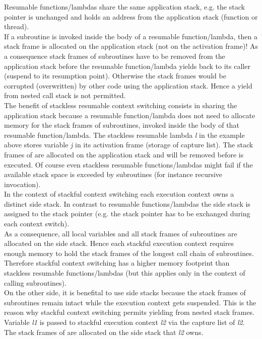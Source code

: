 Resumable functions/lambdas share the same application stack, e.g. the stack
pointer is unchanged and holds an address from the application stack (function
\main or thread).\\
If a subroutine is invoked inside the body of a resumable function/lambda, then
a stack frame is allocated on the application stack (not on the activation
frame)! As a consequence stack frames of subroutines have to be removed from the
application stack before the resumable function/lambda yields back to its caller
(suspend to its resumption point). Otherwise the stack frames would be corrupted
(overwritten) by other code using the application stack. Hence a yield from
nested call stack is not permitted.\\
The benefit of stackless resumable context switching consists in sharing the
application stack because a resumable function/lambda does not need to allocate
memory for the stack frames of subroutines, invoked inside the body of that
resumable function/lambda.
The stackless resumable lambda \textit{l} in the example above stores variable 
\textit{j} in its activation frame (storage of capture list). The stack frames of
 are allocated on the application stack and will be removed
before \yield is executed.
\newline
Of course even stackless resumable functions/lambdas might fail if the available
stack space is exceeded by subroutines (for instance recursive invocation).\\
\newline
In the context of stackful context switching each execution context owns a
distinct side stack. In contrast to resumable functions/lambdas the side stack
is assigned to the stack pointer (e.g. the stack pointer has to be exchanged
during each context switch).\\
As a consequence, all local variables and all stack frames of subroutines are
allocated on the side stack. Hence each stackful execution context requires
enough memory to hold the stack frames of the longest call chain of subroutines.
Therefore stackful context switching has a higher memory footprint than
stackless resumable functions/lambdas (but this applies only in the context of
calling subroutines).\\
On the other side, it is benefital to use side stacks because the stack frames
of subroutines remain intact while the execution context gets suspended. This is
the reason why stackful context switching permits yielding from nested stack
frames.
Variable \textit{l1} is passed to stackful execution context \textit{l2} via
the capture list of \textit{l2}. The stack frames of  are
allocated on the side stack that \textit{l2} owns.
